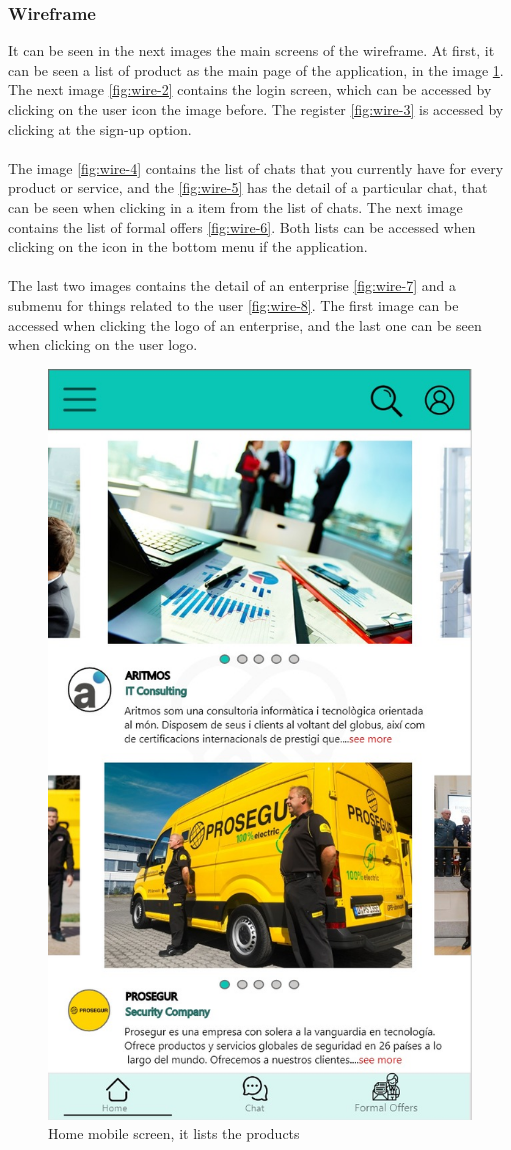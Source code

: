 \documentclass[./main.tex]{subfiles}
\begin{document}
\subsubsection{Wireframe}
It can be seen in the next images the main screens of the wireframe. At first, it can be seen a list of product
as the main page of the application, in the image \ref{fig:wire-1}. The next image \ref{fig:wire-2} contains the login screen, which can be accessed by clicking on the user icon the image before. The register \ref{fig:wire-3} is accessed by clicking at the sign-up option.\\
\\
The image \ref{fig:wire-4} contains the list of chats that you currently have for every product or service, and the \ref{fig:wire-5} has the detail of a particular chat, that can be seen when clicking in a item from the list of chats. The next image contains the list of formal offers \ref{fig:wire-6}. Both lists can be accessed when clicking on the icon in the bottom menu if the application.\\
\\
The last two images contains the detail of an enterprise \ref{fig:wire-7} and a submenu for things related to the user \ref{fig:wire-8}. The first image can be accessed when clicking the logo of an enterprise, and the last one can be seen when clicking on the user logo. 
\begin{figure}[H]
	\centering
	\includegraphics[width=0.5\linewidth]{img/home-page.jpeg}
	\caption{Home mobile screen, it lists the products}
	\label{fig:wire-1}
\end{figure}
\end{document}
